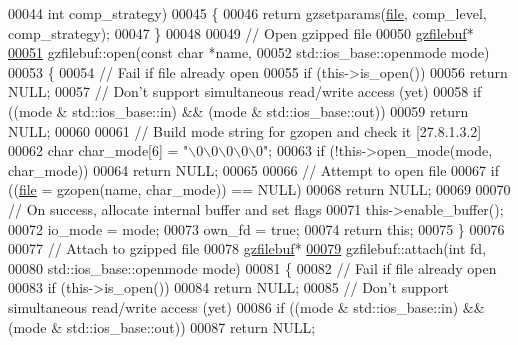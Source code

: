 \begin{DoxyCode}
00044                           \textcolor{keywordtype}{int} comp\_strategy)
00045 \{
00046   \textcolor{keywordflow}{return} gzsetparams(\hyperlink{structfile}{file}, comp\_level, comp\_strategy);
00047 \}
00048 
00049 \textcolor{comment}{// Open gzipped file}
00050 \hyperlink{classgzfilebuf}{gzfilebuf}*
\hyperlink{classgzfilebuf_a9582843a0caa22cb1b4ead1c687dabb2}{00051} gzfilebuf::open(\textcolor{keyword}{const} \textcolor{keywordtype}{char} *name,
00052                 std::ios\_base::openmode mode)
00053 \{
00054   \textcolor{comment}{// Fail if file already open}
00055   \textcolor{keywordflow}{if} (this->is\_open())
00056     \textcolor{keywordflow}{return} NULL;
00057   \textcolor{comment}{// Don't support simultaneous read/write access (yet)}
00058   \textcolor{keywordflow}{if} ((mode & std::ios\_base::in) && (mode & std::ios\_base::out))
00059     \textcolor{keywordflow}{return} NULL;
00060 
00061   \textcolor{comment}{// Build mode string for gzopen and check it [27.8.1.3.2]}
00062   \textcolor{keywordtype}{char} char\_mode[6] = \textcolor{stringliteral}{"\(\backslash\)0\(\backslash\)0\(\backslash\)0\(\backslash\)0\(\backslash\)0"};
00063   \textcolor{keywordflow}{if} (!this->open\_mode(mode, char\_mode))
00064     \textcolor{keywordflow}{return} NULL;
00065 
00066   \textcolor{comment}{// Attempt to open file}
00067   \textcolor{keywordflow}{if} ((\hyperlink{structfile}{file} = gzopen(name, char\_mode)) == NULL)
00068     \textcolor{keywordflow}{return} NULL;
00069 
00070   \textcolor{comment}{// On success, allocate internal buffer and set flags}
00071   this->enable\_buffer();
00072   io\_mode = mode;
00073   own\_fd = \textcolor{keyword}{true};
00074   \textcolor{keywordflow}{return} \textcolor{keyword}{this};
00075 \}
00076 
00077 \textcolor{comment}{// Attach to gzipped file}
00078 \hyperlink{classgzfilebuf}{gzfilebuf}*
\hyperlink{classgzfilebuf_ae8a47750ca65bc2a43b4768b47f3923a}{00079} gzfilebuf::attach(\textcolor{keywordtype}{int} fd,
00080                   std::ios\_base::openmode mode)
00081 \{
00082   \textcolor{comment}{// Fail if file already open}
00083   \textcolor{keywordflow}{if} (this->is\_open())
00084     \textcolor{keywordflow}{return} NULL;
00085   \textcolor{comment}{// Don't support simultaneous read/write access (yet)}
00086   \textcolor{keywordflow}{if} ((mode & std::ios\_base::in) && (mode & std::ios\_base::out))
00087     \textcolor{keywordflow}{return} NULL;

\end{DoxyCode}

